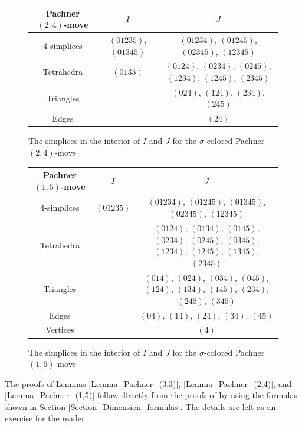 \documentclass[a4paper, oneside]{amsart}
\makeatletter
\let\origsection\section
\renewcommand\section{\@ifstar{\starsection}{\nostarsection}}
\newcommand\nostarsection[1]
{\sectionprelude\origsection{#1}\sectionpostlude}
\newcommand\starsection[1]
{\sectionprelude\origsection*{#1}\sectionpostlude}
\newcommand\sectionprelude{%
  \vspace{1em}
}
\newcommand\sectionpostlude{%
  \vspace{1em}
}
\numberwithin{equation}{subsection}
\theoremstyle{referencedlemma}
\theoremstyle{plain} %
\theoremstyle{remark}
\makeatother
\begin{document}
\begin{figure}[h]
\begin{center}
\begin{tabular}{c | c | c}
Pachner $(2,4)$-move& $I$ & $J$ \\
\hline
4-simplices & $(01235)$, $(01345)$ & $(01234)$, $(01245)$, $(02345)$, $(12345)$ \\ \hline 
Tetrahedra & $(0135)$  & $(0124)$, $(0234)$, $(0245)$, $(1234)$, $(1245)$, $(2345)$  \\ \hline
Triangles &   & $(024)$, $(124)$, $(234)$, $(245)$  \\ \hline
Edges & & $(24)$
\end{tabular}
\end{center}
\caption{The simplices in the interior of $I$ and $J$ for the $\sigma$-colored Pachner $(2,4)$-move}
\label{fig:Pachner_(2,4)}
\end{figure}

\begin{figure}[h]
\begin{center}
\begin{tabular}{c | c | c}
Pachner $(1,5)$-move& $I$ & $J$ \\
\hline
4-simplices & $(01235)$ & $(01234)$, $(01245)$, $(01345)$, $(02345)$, $(12345)$  \\ \hline 
Tetrahedra & & $(0124)$, $(0134)$, $(0145)$, $(0234)$, $(0245)$, $(0345)$, $(1234)$, $(1245)$, $(1345)$, $(2345)$  \\ \hline
Triangles &   & $(014)$, $(024)$, $(034)$, $(045)$, $(124)$, $(134)$, $(145)$, $(234)$, $(245)$, $(345)$  \\ \hline
Edges & & $(04)$, $(14)$, $(24)$, $(34)$, $(45)$ \\ \hline
Vertices &  & $(4)$
\end{tabular}
\end{center}
\caption{The simplices in the interior of $I$ and $J$ for the $\sigma$-colored Pachner $(1,5)$-move}
\label{fig:Pachner_(1,5)}
\end{figure}

The proofs of Lemmas \ref{Lemma_Pachner_(3,3)},  \ref{Lemma_Pachner_(2,4)}, and \ref{Lemma_Pachner_(1,5)} follow directly from the proofs of \cite[Lemmas 4.3.4, 4.3.5, and 4.3.6]{douglas_fusion_2018} by using the formulas shown in Section \ref{Section_Dimension_formulas}.  The details are left as an exercise for the reader. 



\section{Proof of Lemma \ref{Pachner_(1,5)}}\label{Section_Proof of Lemma 8.3.1}
\end{document}
